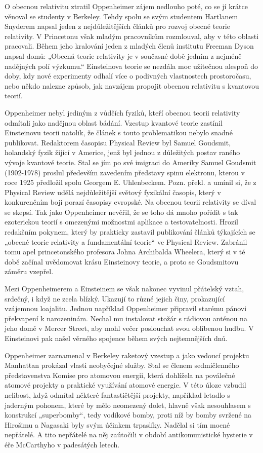   O obecnou relativitu ztratil Oppenheimer zájem nedlouho poté, co se jí krátce věnoval se studenty
  v Berkeley. Tehdy spolu se svým studentem Hartlanem Snyderem napsal jeden z nejdůležitějších
  článků pro rozvoj obecné teorie relativity. V Princetonu však mladým pracovníkům rozmlouval, aby v
  této oblasti pracovali. Během jeho kralování jeden z mladých členů institutu Freeman Dyson napsal
  domů: „Obecná teorie relativity je v současné době jedním z nejméně nadějných polí výzkumu.“
  Einsteinova teorie se nezdála moc užitečnou alespoň do doby, kdy nové experimenty odhalí více o
  podivných vlastnostech prostoročasu, nebo někdo nalezne způsob, jak navzájem propojit obecnou
  relativitu s kvantovou teorií. 
  
  Oppenheimer nebyl jediným z vůdčích fyziků, kteří obecnou teorii relativity odmítali jako nadějnou
  oblast bádání. Vzestup kvantové teorie zastínil Einsteinovu teorii natolik, že článek s touto
  problematikou nebylo snadné publikovat. Redaktorem časopisu Physical Review byl Samuel Goudsmit,
  holandský fyzik žijící v Americe, jenž byl jednou z důležitých postav raného vývoje kvantové
  teorie. Stal se jím po své imigraci do Ameriky Samuel Goudsmit (1902-1978) proslul především
  zavedením představy spinu elektronu, kterou v roce 1925 předložil spolu Georgem E. Uhlenbeckem.
  Pozn. překl. a umínil si, že z Physical Review udělá nejdůležitější světový fyzikální časopis,
  který v konkurenčním boji porazí časopisy evropské. Na obecnou teorii relativity se díval se
  skepsí. Tak jako Oppenheimer nevěřil, že se toho dá mnoho pořídit s tak ezoterickou teorií s
  omezenými možnostmi aplikace a testovatelnosti. Hrozil redakčním pokynem, který by prakticky
  zastavil publikování článků týkajících se „obecné teorie relativity a fundamentální teorie“ ve
  Physical Review. Zabránil tomu apel princetonského profesora Johna Archibalda Wheelera, který si v
  té době začínal uvědomovat krásu Einsteinovy teorie, a proto se Goudsmitovu záměru vzepřel. 
  
  Mezi Oppenheimerem a Einsteinem se však nakonec vyvinul přátelský vztah, srdečný, i když ne zcela
  blízký. Ukazují to různé jejich činy, prokazující vzájemnou loajalitu. Jednou například
  Oppenheimer připravil starému pánovi překvapení k narozeninám. Nechal mu instalovat stožár s
  rádiovou anténou na jeho domě v Mercer Street, aby mohl večer poslouchat svou oblíbenou hudbu. V
  Einsteinovi pak našel věrného spojence během svých nejtemnějších dnů. 
  
  Oppenheimer zaznamenal v Berkeley raketový vzestup a jako vedoucí projektu Manhattan prokázal
  vlasti neobyčejné služby. Stal se členem sedmičlenného představenstva Komise pro atomovou energii,
  která dohlížela na poválečné atomové projekty a praktické využívání atomové energie. V této úloze
  vzbudil nelibost, když odmítal některé fantastičtější projekty, například letadlo s jaderným
  pohonem, které by mělo neomezený dolet, hlavně však nesouhlasem s konstrukcí „superbomby“, tedy
  vodíkové bomby, proti níž by bomby svržené na Hirošimu a Nagasaki byly svým účinkem trpaslíky.
  Nadělal si tím mocné nepřátelé. A tito nepřátelé na něj zaútočili v období antikomunistické
  hysterie v éře McCarthyho v padesátých letech. 
  
